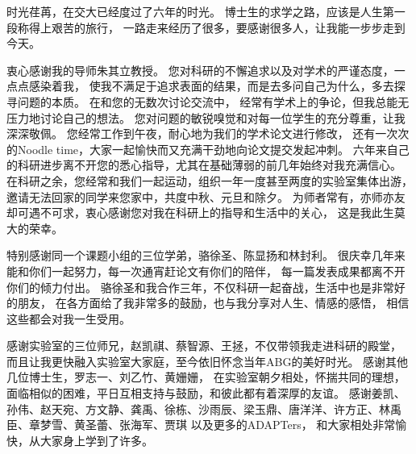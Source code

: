 \begin{thanks}

%
%
%  
%  
%  
%

时光荏苒，在交大已经度过了六年的时光。
博士生的求学之路，应该是人生第一段称得上艰苦的旅行，
一路走来经历了很多，要感谢很多人，让我能一步步走到今天。

衷心感谢我的导师朱其立教授。
您对科研的不懈追求以及对学术的严谨态度，一点点感染着我，
使我不满足于追求表面的结果，而是去多问自己为什么，多去探寻问题的本质。
在和您的无数次讨论交流中，
经常有学术上的争论，但我总能无压力地讨论自己的想法。
您对问题的敏锐嗅觉和对每一位学生的充分尊重，让我深深敬佩。
您经常工作到午夜，耐心地为我们的学术论文进行修改， 
还有一次次的Noodle time，大家一起愉快而又充满干劲地向论文提交发起冲刺。
六年来自己的科研进步离不开您的悉心指导，尤其在基础薄弱的前几年始终对我充满信心。
在科研之余，您经常和我们一起运动，组织一年一度甚至两度的实验室集体出游，
邀请无法回家的同学来您家中，共度中秋、元旦和除夕。
为师者常有，亦师亦友却可遇不可求，衷心感谢您对我在科研上的指导和生活中的关心，
这是我此生莫大的荣幸。

特别感谢同一个课题小组的三位学弟，骆徐圣、陈显扬和林封利。
很庆幸几年来能和你们一起努力，每一次通宵赶论文有你们的陪伴，
每一篇发表成果都离不开你们的倾力付出。
骆徐圣和我合作三年，不仅科研一起奋战，生活中也是非常好的朋友，
在各方面给了我非常多的鼓励，也与我分享对人生、情感的感悟，
相信这些都会对我一生受用。

感谢实验室的三位师兄，赵凯祺、蔡智源、王拯，不仅带领我走进科研的殿堂，
而且让我更快融入实验室大家庭，至今依旧怀念当年ABG的美好时光。
感谢其他几位博士生，罗志一、刘乙竹、黄姗姗，
在实验室朝夕相处，怀揣共同的理想，面临相似的困难，平日互相支持与鼓励，和彼此都有着深厚的友谊。
感谢姜凯、孙伟、赵天宛、方文静、龚禹、徐栋、沙雨辰、梁玉鼎、唐洋洋、许方正、林禹臣、章梦雪、黄圣蕾、张海军、贾琪
以及更多的ADAPTers，
和大家相处非常愉快，从大家身上学到了许多。%


\end{thanks}
